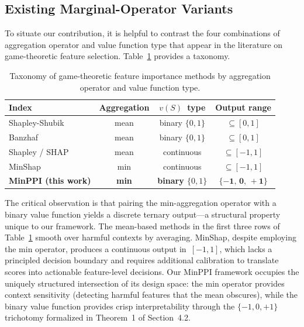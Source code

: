\documentclass{article} %
\begin{document}
\subsection{Existing Marginal-Operator Variants}

To situate our contribution, it is helpful to contrast the four combinations of aggregation operator and value function type that appear in the literature on game-theoretic feature selection. Table~\ref{tab:operator-comparison} provides a taxonomy.

\begin{table}[t]
\caption{Taxonomy of game-theoretic feature importance methods by aggregation operator and value function type.}
\label{tab:operator-comparison}
\begin{center}
\begin{tabular}{lccc}
\toprule
\textbf{Index} & \textbf{Aggregation} & $v(S)$~\textbf{type} & \textbf{Output range} \\
\midrule
Shapley-Shubik~\citep{shapley1954method} & mean & binary $\{0,1\}$ & $\subseteq [0,1]$ \\
Banzhaf~\citep{banzhaf1965weighted} & mean & binary $\{0,1\}$ & $\subseteq [0,1]$ \\
Shapley / SHAP~\citep{lundberg2017unified} & mean & continuous & $\subseteq [-1,1]$ \\
MinShap~\citep{zheng2026minshap} & min & continuous & $\subseteq [-1,1]$ \\
\midrule
\textbf{MinPPI (this work)} & \textbf{min} & \textbf{binary $\{0,1\}$} & $\mathbf{\{-1,\,0,\,+1\}}$ \\
\bottomrule
\end{tabular}
\end{center}
\end{table}

The critical observation is that pairing the min-aggregation operator with a binary value function yields a discrete ternary output---a structural property unique to our framework. The mean-based methods in the first three rows of Table~\ref{tab:operator-comparison} smooth over harmful contexts by averaging. MinShap, despite employing the min operator, produces a continuous output in~$[-1,1]$, which lacks a principled decision boundary and requires additional calibration to translate scores into actionable feature-level decisions. Our MinPPI framework occupies the uniquely structured intersection of its design space: the min operator provides context sensitivity (detecting harmful features that the mean obscures), while the binary value function provides crisp interpretability through the $\{-1, 0, +1\}$ trichotomy formalized in Theorem~1 of Section~4.2.
\end{document}
